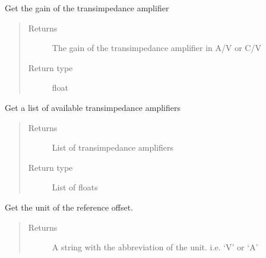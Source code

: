 \documentclass[letterpaper,10pt,english]{sphinxmanual}
\begin{document}
\begin{fulllineitems}
\begin{fulllineitems}
\label{\detokenize{index:TiePieLCR_settings.TiePieLCR_settings.get_reference_gain}}
\sphinxAtStartPar
Get the gain of the transimpedance amplifier
\begin{quote}\begin{description}
\item[{Returns}] \leavevmode
\sphinxAtStartPar
The gain of the transimpedance amplifier in A/V or C/V

\item[{Return type}] \leavevmode
\sphinxAtStartPar
float

\end{description}\end{quote}

\end{fulllineitems}


\begin{fulllineitems}
\label{\detokenize{index:TiePieLCR_settings.TiePieLCR_settings.get_reference_name_list}}
\sphinxAtStartPar
Get a list of available transimpedance amplifiers
\begin{quote}\begin{description}
\item[{Returns}] \leavevmode
\sphinxAtStartPar
List of transimpedance amplifiers

\item[{Return type}] \leavevmode
\sphinxAtStartPar
List of floats

\end{description}\end{quote}

\end{fulllineitems}


\begin{fulllineitems}
\label{\detokenize{index:TiePieLCR_settings.TiePieLCR_settings.get_reference_offset_unit}}
\sphinxAtStartPar
Get the unit of the reference offset.
\begin{quote}\begin{description}
\item[{Returns}] \leavevmode
\sphinxAtStartPar
A string with the abbreviation of the unit. i.e. ‘V’ or ‘A’


\end{description}
\end{quote}
\end{fulllineitems}
\end{fulllineitems}
\end{document}
